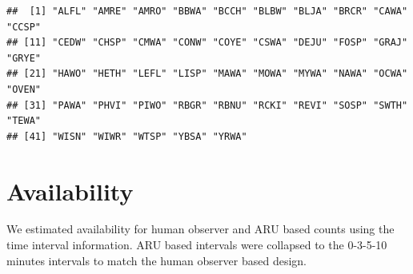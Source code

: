 \documentclass[12pt,]{book}
\newenvironment{Shaded}{\begin{snugshade}}{\end{snugshade}}
\newcommand{\DataTypeTok}[1]{\textcolor[rgb]{0.13,0.29,0.53}{#1}}
\newcommand{\DecValTok}[1]{\textcolor[rgb]{0.00,0.00,0.81}{#1}}
\newcommand{\KeywordTok}[1]{\textcolor[rgb]{0.13,0.29,0.53}{\textbf{#1}}}
\newcommand{\NormalTok}[1]{#1}
\newcommand{\OperatorTok}[1]{\textcolor[rgb]{0.81,0.36,0.00}{\textbf{#1}}}
\newcommand{\OtherTok}[1]{\textcolor[rgb]{0.56,0.35,0.01}{#1}}
\newcommand{\StringTok}[1]{\textcolor[rgb]{0.31,0.60,0.02}{#1}}
\begin{document}
\begin{verbatim}
##  [1] "ALFL" "AMRE" "AMRO" "BBWA" "BCCH" "BLBW" "BLJA" "BRCR" "CAWA" "CCSP"
## [11] "CEDW" "CHSP" "CMWA" "CONW" "COYE" "CSWA" "DEJU" "FOSP" "GRAJ" "GRYE"
## [21] "HAWO" "HETH" "LEFL" "LISP" "MAWA" "MOWA" "MYWA" "NAWA" "OCWA" "OVEN"
## [31] "PAWA" "PHVI" "PIWO" "RBGR" "RBNU" "RCKI" "REVI" "SOSP" "SWTH" "TEWA"
## [41] "WISN" "WIWR" "WTSP" "YBSA" "YRWA"
\end{verbatim}

\hypertarget{availability}{%
\section{Availability}\label{availability}}

We estimated availability for human observer and ARU based counts
using the time interval information. ARU based intervals were
collapsed to the 0-3-5-10 minutes intervals to match the human observer based
design.

\begin{Shaded}
\end{Shaded}
\end{document}
